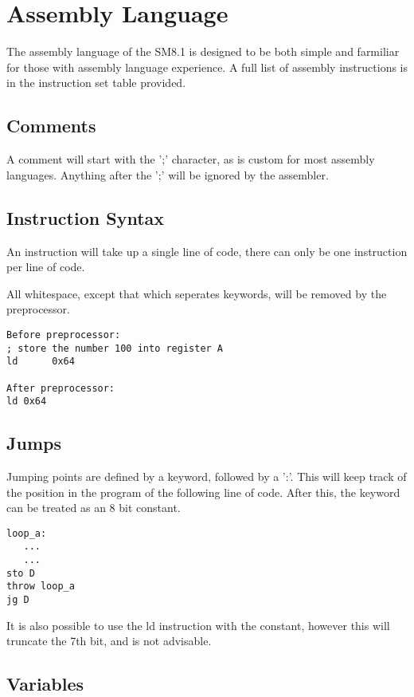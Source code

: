 \documentclass[11pt]{article}
\begin{document}
\section{Assembly Language}
The assembly language of the SM8.1 is designed to be both simple and farmiliar for those with assembly language experience. A full list of assembly instructions is in the instruction set table provided.
\newpage
\subsection{Comments}
A comment will start with the ';' character, as is custom for most assembly languages. Anything after the ';' will be ignored by the assembler.
\subsection{Instruction Syntax}
An instruction will take up a single line of code, there can only be one instruction per line of code.

All whitespace, except that which seperates keywords, will be removed by the preprocessor.
\begin{verbatim}
Before preprocessor:
; store the number 100 into register A
ld      0x64

After preprocessor:
ld 0x64
\end{verbatim}
\subsection{Jumps}
Jumping points are defined by a keyword, followed by a ':'. This will keep track of the position in the program of the following line of code. After this, the keyword can be treated as an 8 bit constant.
\begin{verbatim}
loop_a:
   ...
   ...
sto D
throw loop_a
jg D
\end{verbatim}
It is also possible to use the ld instruction with the constant, however this will truncate the 7th bit, and is not advisable.
\subsection{Variables}
\end{document}
